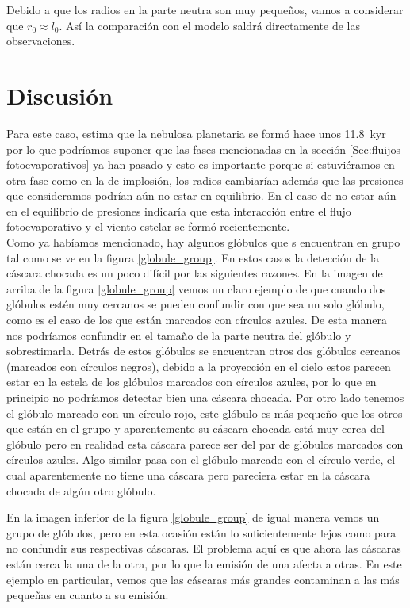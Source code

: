 \documentclass{book}
\begin{document}
Debido a que los radios en la parte neutra son muy pequeños, vamos a considerar que $r_0\approx l_0$. Así la comparación con el modelo saldrá directamente de las observaciones. 

\chapter{Discusión}

Para este caso, \cite{Zavala:2022} estima que la nebulosa planetaria se formó hace unos \SI{11.8}{kyr} por lo que podríamos suponer que las fases mencionadas en la sección \ref{Sec:fluijos fotoevaporativos} ya han pasado y esto es importante porque si estuviéramos en otra fase como en la de implosión, los radios cambiarían además que las presiones que consideramos podrían aún no estar en equilibrio. En el caso de no estar aún en el equilibrio de presiones indicaría que esta interacción entre el flujo fotoevaporativo y el viento estelar se formó recientemente.\\

Como ya habíamos mencionado, hay algunos glóbulos que s encuentran en grupo tal como se ve en la figura \ref{globule_group}. En estos casos la detección de la cáscara chocada es un poco difícil por las siguientes razones. En la imagen de arriba de la figura \ref{globule_group} vemos un claro ejemplo de que cuando dos glóbulos estén muy cercanos se pueden confundir con que sea un solo glóbulo, como es el caso de los que están marcados con círculos azules. De esta manera nos podríamos confundir en el tamaño de la parte neutra del glóbulo y sobrestimarla. Detrás de estos glóbulos se encuentran otros dos glóbulos cercanos (marcados con círculos negros), debido a la proyección en el cielo estos parecen estar en la estela de los glóbulos marcados con círculos azules, por lo que en principio no podríamos detectar bien una cáscara chocada. Por otro lado tenemos el glóbulo marcado con un círculo rojo, este glóbulo es más pequeño que los otros que están en el grupo y aparentemente su cáscara chocada está muy cerca del glóbulo pero en realidad esta cáscara parece ser del par de glóbulos marcados con círculos azules. Algo similar pasa con el glóbulo marcado con el círculo verde, el cual aparentemente no tiene una cáscara pero pareciera estar en la cáscara chocada de algún otro glóbulo.

En la imagen inferior de la figura \ref{globule_group} de igual manera vemos un grupo de glóbulos, pero en esta ocasión están lo suficientemente lejos como para no confundir sus respectivas cáscaras. El problema aquí es que ahora las cáscaras están cerca la una de la otra, por lo que la emisión de una afecta a otras. En este ejemplo en particular, vemos que las cáscaras más grandes contaminan a las más pequeñas en cuanto a su emisión.\\
\end{document}
